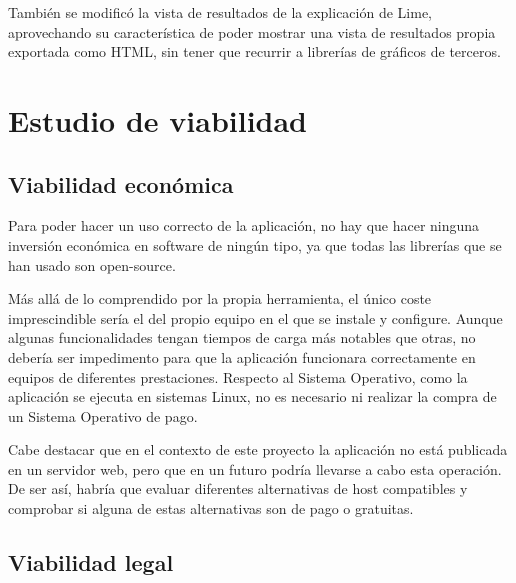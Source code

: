También se modificó la vista de resultados de la explicación de Lime, aprovechando su característica de poder mostrar una vista de resultados propia exportada como HTML, sin tener que recurrir a librerías de gráficos de terceros.

\section{Estudio de viabilidad}

\subsection{Viabilidad económica}

Para poder hacer un uso correcto de la aplicación, no hay que hacer ninguna inversión económica en software de ningún tipo, ya que todas las librerías que se han usado son open-source.

Más allá de lo comprendido por la propia herramienta, el único coste imprescindible sería el del propio equipo en el que se instale y configure. Aunque algunas funcionalidades tengan tiempos de carga más notables que otras, no debería ser impedimento para que la aplicación funcionara correctamente en equipos de diferentes prestaciones. Respecto al Sistema Operativo, como la aplicación se ejecuta en sistemas Linux, no es necesario ni realizar la compra de un Sistema Operativo de pago.

Cabe destacar que en el contexto de este proyecto la aplicación no está publicada en un servidor web, pero que en un futuro podría llevarse a cabo esta operación. De ser así, habría que evaluar diferentes alternativas de host compatibles y comprobar si alguna de estas alternativas son de pago o gratuitas.

\subsection{Viabilidad legal}


